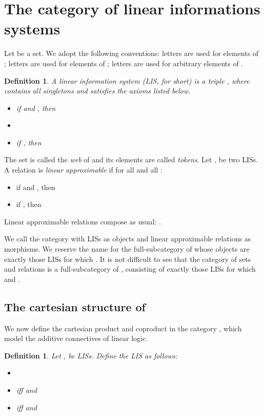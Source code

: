 \documentclass[copyright,creativecommons]{eptcs}
\newtheorem{definition}[theorem]{Definition}
\begin{document}
\section{The category of linear informations systems}

Let  be a set. We adopt the following conventions: letters  are used for elements of ; letters  are used for elements of ; letters  are used for arbitrary elements of .

\begin{definition}
A \emph{linear information system} (LIS, for short) is a triple , where \mbox{} contains all singletons and  satisfies the axioms listed below.
\begin{itemize}
\item[(IS1)] if  and , then 
\item[(IS2)] 
\item[(IS3)] if , then 
\end{itemize}
\end{definition}

The set  is called the \emph{web} of  and its elements are called \emph{tokens}. Let ,  be two LISs. A relation  is \emph{linear approximable} if for all  and all :
\begin{itemize}
\item[(AR1)] if  and , then 
\item[(AR2)] if , then 
\end{itemize}

Linear approximable relations compose as usual: .

We call  the category with LISs as objects and linear approximable relations as morphisms. We reserve the name  for the full-subcategory of  whose objects are exactly those LISs  for which . It is not difficult to see that the category  of sets and relations is a full-subcategory of , consisting of exactly those LISs  for which  and \mbox{}.

\subsection{The cartesian structure of }

We now define the cartesian product and coproduct in the category , which model the additive connectives of linear logic.

\medskip

\begin{definition}
Let ,  be LISs. Define the LIS  as follows:
\begin{itemize}
\item 
\item  iff  and 
\item  iff  and 
\end{itemize}
\end{definition}
\end{document}
